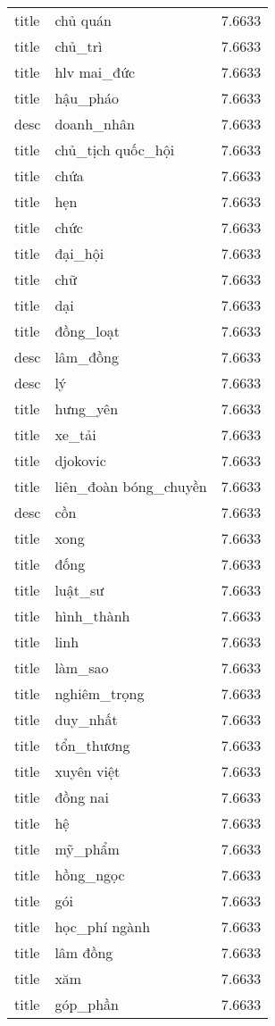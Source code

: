 \documentclass{article}
\begin{document}
\begin{tabular}{lll}
title & chủ quán & 7.6633\\
title & chủ\_trì & 7.6633\\
title & hlv mai\_đức & 7.6633\\
title & hậu\_pháo & 7.6633\\
desc & doanh\_nhân & 7.6633\\
title & chủ\_tịch quốc\_hội & 7.6633\\
title & chứa & 7.6633\\
title & hẹn & 7.6633\\
title & chức & 7.6633\\
title & đại\_hội & 7.6633\\
title & chữ & 7.6633\\
title & dại & 7.6633\\
title & đồng\_loạt & 7.6633\\
desc & lâm\_đồng & 7.6633\\
desc & lý & 7.6633\\
title & hưng\_yên & 7.6633\\
title & xe\_tải & 7.6633\\
title & djokovic & 7.6633\\
title & liên\_đoàn bóng\_chuyền & 7.6633\\
desc & cồn & 7.6633\\
title & xong & 7.6633\\
title & đống & 7.6633\\
title & luật\_sư & 7.6633\\
title & hình\_thành & 7.6633\\
title & linh & 7.6633\\
title & làm\_sao & 7.6633\\
title & nghiêm\_trọng & 7.6633\\
title & duy\_nhất & 7.6633\\
title & tổn\_thương & 7.6633\\
title & xuyên việt & 7.6633\\
title & đồng nai & 7.6633\\
title & hệ & 7.6633\\
title & mỹ\_phẩm & 7.6633\\
title & hồng\_ngọc & 7.6633\\
title & gói & 7.6633\\
title & học\_phí ngành & 7.6633\\
title & lâm đồng & 7.6633\\
title & xăm & 7.6633\\
title & góp\_phần & 7.6633\\

\end{tabular}
\end{document}

